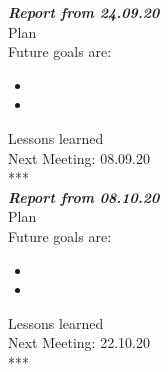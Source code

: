 \documentclass{scrartcl}
\begin{document}
\textbf{\textit{Report from 24.09.20  }}\\
Plan\\
Future goals are: 
\begin{itemize}


	\item 
	\item 
\end{itemize}	
Lessons learned\\

Next Meeting: 08.09.20\\
\**** \\
\textbf{\textit{Report from 08.10.20  }}\\
Plan\\
Future goals are: 
\begin{itemize}


	\item 
	\item 
\end{itemize}	
Lessons learned\\

Next Meeting: 22.10.20\\


\****
\end{document}
